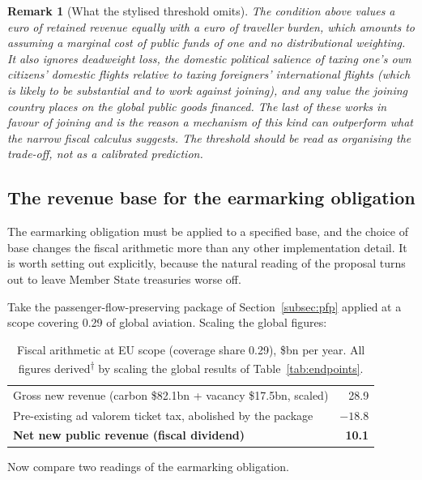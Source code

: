 \documentclass[11pt]{article}
\newtheorem{remark}{Remark}
\newcommand{\derived}{\textsuperscript{$\dagger$}}
\begin{document}
\begin{remark}[What the stylised threshold omits]
The condition above values a euro of retained revenue equally with a euro of
traveller burden, which amounts to assuming a marginal cost of public funds of
one and no distributional weighting. It also ignores deadweight loss, the
domestic political salience of taxing one's own citizens' domestic flights
relative to taxing foreigners' international flights (which is likely to be
substantial and to work against joining), and any value the joining country
places on the global public goods financed. The last of these works in favour of
joining and is the reason a mechanism of this kind can outperform what the
narrow fiscal calculus suggests. The threshold should be read as organising the
trade-off, not as a calibrated prediction.
\end{remark}

\subsection{The revenue base for the earmarking obligation}
\label{subsec:base}

The earmarking obligation must be applied to a specified base, and the choice of
base changes the fiscal arithmetic more than any other implementation detail. It
is worth setting out explicitly, because the natural reading of the proposal
turns out to leave Member State treasuries worse off.

Take the passenger-flow-preserving package of Section~\ref{subsec:pfp} applied at
a scope covering 0.29 of global aviation. Scaling the global figures:

\begin{table}[htbp]
\centering
\small
\caption{Fiscal arithmetic at EU scope (coverage share 0.29), \$bn per year.
All figures derived\derived{} by scaling the global results of
Table~\ref{tab:endpoints}.}
\label{tab:eu-fiscal}
\begin{tabular}{@{}lr@{}}
\toprule
Gross new revenue (carbon \$82.1bn + vacancy \$17.5bn, scaled) & 28.9 \\
Pre-existing ad valorem ticket tax, abolished by the package & $-18.8$ \\
\midrule
\textbf{Net new public revenue (fiscal dividend)} & \textbf{10.1} \\
\bottomrule
\end{tabular}
\end{table}

Now compare two readings of the earmarking obligation.
\end{document}

